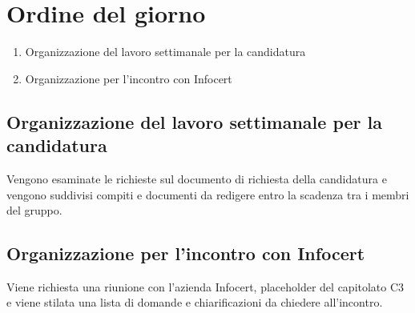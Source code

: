 \section{Ordine del giorno}
\begin{enumerate}
\item Organizzazione del lavoro settimanale per la candidatura
\item Organizzazione per l'incontro con Infocert
\end{enumerate}

\subsection{Organizzazione del lavoro settimanale per la candidatura}
Vengono esaminate le richieste sul documento di richiesta della candidatura e vengono
suddivisi compiti e documenti da redigere entro la scadenza tra i membri del gruppo.

\subsection{Organizzazione per l'incontro con Infocert}
Viene richiesta una riunione con l’azienda Infocert, placeholder del capitolato C3 e viene
stilata una lista di domande e chiarificazioni da chiedere all’incontro.
